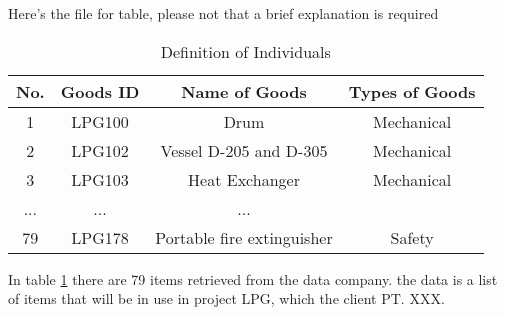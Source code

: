 Here's the file for table, please not that a brief explanation is required

\begin{table}[h]
    \caption{Definition of Individuals}
    \centering
    \begin{tabular}{c c c c}
    \hline
    No. & Goods ID & Name of Goods & Types of Goods \\
    \hline
    1 & LPG100 & Drum & Mechanical \\
    2 & LPG102 & Vessel D-205 and D-305 & Mechanical \\
    3 & LPG103 & Heat Exchanger & Mechanical\\
    ... & ... & ... \\
    79 & LPG178 & Portable fire extinguisher & Safety \\
    \hline
    \end{tabular}
    \label{table}
\end{table}

\par In table \ref{table} there are 79 items retrieved from the data company. the data is a list of items that will be in use in project LPG, which the client PT. XXX. 